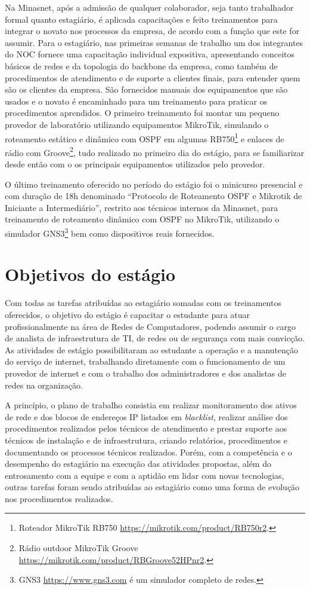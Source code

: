     Na Minasnet, após a admissão de qualquer colaborador, seja tanto trabalhador formal quanto estagiário, é aplicada capacitações e feito treinamentos para integrar o novato nos processos da empresa, de acordo com a função que este for assumir. Para o estagiário, nas primeiras semanas de trabalho um dos integrantes do NOC fornece uma capacitação individual expositiva, apresentando conceitos básicos de redes e da topologia do backbone da empresa, como também de procedimentos de atendimento e de suporte a clientes finais, para entender quem são os clientes da empresa. São fornecidos manuais dos equipamentos que são usados e o novato é encaminhado para um treinamento para praticar os procedimentos aprendidos. O primeiro treinamento foi montar um pequeno provedor de laboratório utilizando equipamentos MikroTik, simulando o roteamento estático e dinâmico com OSPF em algumas RB750\footnote{Roteador MikroTik RB750 \url{https://mikrotik.com/product/RB750r2}.} e enlaces de rádio com Groove\footnote{Rádio outdoor MikroTik Groove \url{https://mikrotik.com/product/RBGroove52HPnr2}.}, tudo realizado no primeiro dia do estágio, para se familiarizar desde então com o os principais equipamentos utilizados pelo provedor. 
    
    O último treinamento oferecido no período do estágio foi o minicurso presencial e com duração de 18h denominado ``Protocolo de Roteamento OSPF e Mikrotik de Iniciante a Intermediário'', restrito aos técnicos internos da Minasnet, para treinamento de roteamento dinâmico com OSPF no MikroTik, utilizando o simulador GNS3\footnote{GNS3 \url{https://www.gns3.com} é um simulador completo de redes.} bem como dispositivos reais fornecidos.

\section{Objetivos do estágio}
    
    Com todas as tarefas atribuídas ao estagiário somadas com os treinamentos oferecidos, o objetivo do estágio é capacitar o estudante para atuar profissionalmente na área de Redes de Computadores, podendo assumir o cargo de analista de infraestrutura de TI, de redes ou de segurança com mais convicção. As atividades de estágio possibilitaram ao estudante a operação e a manutenção do serviço de internet, trabalhando diretamente com o funcionamento de um provedor de internet e com o trabalho dos administradores e dos analistas de redes na organização.
    
    A princípio, o plano de trabalho consistia em realizar monitoramento dos ativos de rede e dos blocos de endereços IP listados em \textit{blacklist}, realizar análise dos procedimentos realizados pelos técnicos de atendimento e prestar suporte aos técnicos de instalação e de infraestrutura, criando relatórios, procedimentos e documentando os processos técnicos realizados. Porém, com a competência e o desempenho do estagiário na execução das atividades propostas, além do entrosamento com a equipe e com a aptidão em lidar com novas tecnologias, outras tarefas foram sendo atribuídas ao estagiário como uma forma de evolução nos procedimentos realizados.
    
